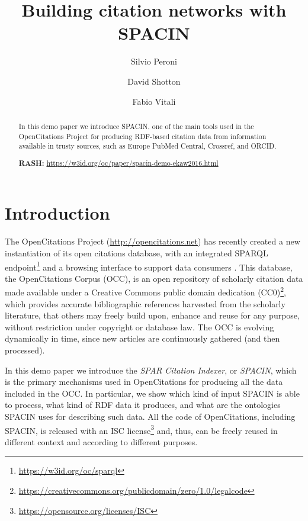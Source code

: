 \documentclass[runningheads,a4paper]{llncs}
\begin{document}
\mainmatter

\title{Building citation networks with SPACIN}

\author{Silvio Peroni \and
David Shotton \and
Fabio Vitali}
\maketitle

\begin{abstract}
In this demo paper we introduce SPACIN, one of the main tools used in the OpenCitations Project for producing RDF-based citation data from information available in trusty sources, such as Europe PubMed Central, Crossref, and ORCID.

{\bf RASH:} \url{https://w3id.org/oc/paper/spacin-demo-ekaw2016.html}

\end{abstract}


\section{Introduction}

The OpenCitations Project (\url{http://opencitations.net})  \cite{__RefNumPara__293_1852566440} has recently created a new instantiation of its open citations database, with an integrated SPARQL endpoint\footnote{\url{https://w3id.org/oc/sparql}} and a browsing interface to support data consumers  \cite{__RefNumPara__14780_1591320820}. This database, the OpenCitations Corpus (OCC), is an open repository of scholarly citation data made available under a Creative Commons public domain dedication (CC0)\footnote{\url{https://creativecommons.org/publicdomain/zero/1.0/legalcode}}, which provides accurate bibliographic references harvested from the scholarly literature, that others may freely build upon, enhance and reuse for any purpose, without restriction under copyright or database law. The OCC is evolving dynamically in time, since new articles are continuously gathered (and then processed).

In this demo paper we introduce the {\em SPAR Citation Indexer}, or {\em SPACIN}, which is the primary mechanisms used in OpenCitations for producing all the data included in the OCC. In particular, we show which kind of input SPACIN is able to process, what kind of RDF data it produces, and what are the ontologies SPACIN uses for describing such data. All the code of OpenCitations, including SPACIN, is released with an ISC license\footnote{\url{https://opensource.org/licenses/ISC}} and, thus, can be freely reused in different context and according to different purposes.
\end{document}

